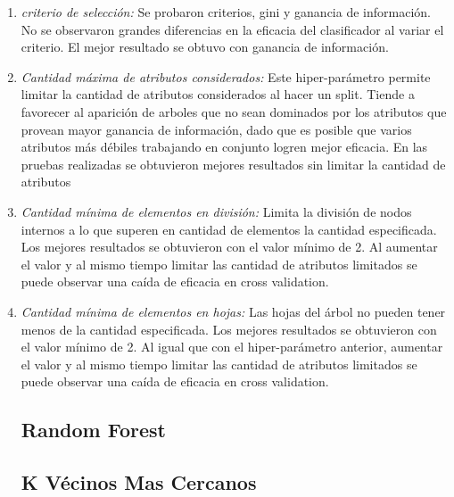  \begin{enumerate}
\item \textit{criterio de selección:} Se probaron criterios, gini y ganancia de información. No se observaron grandes diferencias en la eficacia del clasificador al variar el criterio. El mejor resultado se obtuvo con ganancia de información. 
\item \textit{Cantidad máxima de atributos considerados:} Este hiper-parámetro permite limitar la cantidad de atributos considerados al hacer un split.  Tiende a favorecer al aparición de arboles que no sean dominados por los atributos que provean mayor ganancia de información, dado que es posible que varios atributos más débiles trabajando en conjunto logren mejor eficacia.  En las pruebas realizadas se obtuvieron mejores resultados sin limitar la cantidad de atributos
\item \textit{Cantidad mínima de elementos en división:} Limita la división de nodos internos a lo que superen en cantidad de elementos la cantidad especificada. Los mejores resultados se obtuvieron con el valor mínimo de 2. Al aumentar el valor y al mismo tiempo limitar las cantidad de atributos limitados se puede observar una caída de eficacia en cross validation. 
\item \textit{Cantidad mínima de elementos en hojas:} Las hojas del árbol no pueden tener menos de la cantidad especificada. Los mejores resultados se obtuvieron con el valor mínimo de 2. Al igual que con el hiper-parámetro anterior, aumentar el valor y al mismo tiempo limitar las cantidad de atributos limitados se puede observar una caída de eficacia en cross validation.  

\subsection{Random Forest}



\subsection{K Vécinos Mas Cercanos}


\end{enumerate}

